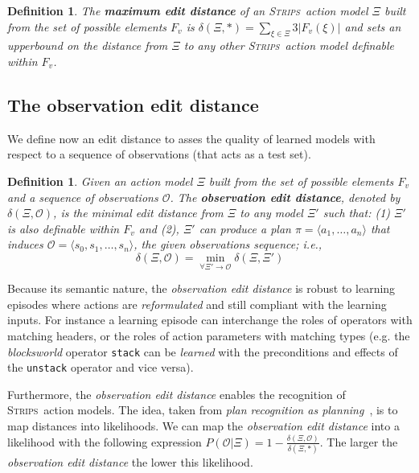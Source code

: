 \documentclass{article}
\newcommand{\tup}[1]{{\langle #1 \rangle}}
\newcommand{\strips}{\textsc{Strips}}     %
\newtheorem{definition}[theorem]{Definition}
\begin{document}
\begin{definition}
The \textbf{maximum edit distance} of an \strips\ action model $\Xi$ built from the set of possible elements $F_v$ is $\delta(\Xi,*)=\sum_{\xi\in\Xi} 3|F_v(\xi)|$ and sets an upperbound on the distance from $\Xi$ to any other \strips\ action model definable within $F_v$.
\end{definition}

\subsection{The observation edit distance}
We define now an edit distance to asses the quality of learned models with respect to a sequence of observations (that acts as a test set).

\begin{definition}
Given an action model $\Xi$ built from the set of possible elements $F_v$ and a sequence of observations $\mathcal{O}$. The {\bf observation edit distance}, denoted by  $\delta(\Xi,\mathcal{O})$, is the minimal edit distance from $\Xi$ to any model $\Xi'$ such that: (1) $\Xi'$ is also definable within $F_v$ and (2), $\Xi'$ can produce a plan $\pi=\tup{a_1, \ldots, a_n}$ that induces $\mathcal{O}=\tup{s_0, s_1, \ldots, s_n}$, the given observations sequence; i.e., \[\delta(\Xi,\mathcal{O})=\min_{\forall \Xi' \rightarrow \mathcal{O}} \delta(\Xi,\Xi')\]
\end{definition}

Because its semantic nature, the {\em observation edit distance} is robust to learning episodes where actions are {\em reformulated} and still compliant with the learning inputs. For instance a learning episode can interchange the roles of operators with matching headers, or the roles of action parameters with matching types (e.g. the {\em blocksworld} operator {\small\tt stack} can be {\em learned} with the preconditions and effects of the {\small\tt unstack} operator and vice versa).

Furthermore, the {\em observation edit distance} enables the recognition of \strips\ action models. The idea, taken from {\em plan recognition as planning}~\cite{ramirez2009plan}, is to map distances into likelihoods. We can map the {\em observation edit distance} into a likelihood with the following expression $P(\mathcal{O}|\Xi)=1-\frac{\delta(\Xi,\mathcal{O})}{\delta(\Xi,*)}$. The larger the {\em observation edit distance} the lower this likelihood.
\end{document}
